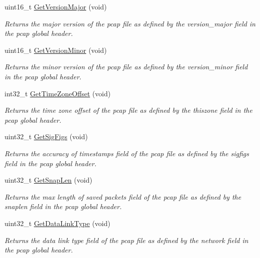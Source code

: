 \begin{DoxyCompactItemize}
uint16\+\_\+t \hyperlink{classns3_1_1PcapFile_a182c0d559994abde0e1c5691bbb6f2bd}{Get\+Version\+Major} (void)
\begin{DoxyCompactList}\small\item\em Returns the major version of the pcap file as defined by the version\+\_\+major field in the pcap global header. \end{DoxyCompactList}\item 
uint16\+\_\+t \hyperlink{classns3_1_1PcapFile_aec2a5893556ce03eface12adc8ef200d}{Get\+Version\+Minor} (void)
\begin{DoxyCompactList}\small\item\em Returns the minor version of the pcap file as defined by the version\+\_\+minor field in the pcap global header. \end{DoxyCompactList}\item 
int32\+\_\+t \hyperlink{classns3_1_1PcapFile_af2f76f02140b0cd7820f630382626d51}{Get\+Time\+Zone\+Offset} (void)
\begin{DoxyCompactList}\small\item\em Returns the time zone offset of the pcap file as defined by the thiszone field in the pcap global header. \end{DoxyCompactList}\item 
uint32\+\_\+t \hyperlink{classns3_1_1PcapFile_a7074106d671684484d083f5970723c07}{Get\+Sig\+Figs} (void)
\begin{DoxyCompactList}\small\item\em Returns the accuracy of timestamps field of the pcap file as defined by the sigfigs field in the pcap global header. \end{DoxyCompactList}\item 
uint32\+\_\+t \hyperlink{classns3_1_1PcapFile_a1ad2956ada10389364ee11fae1937e6b}{Get\+Snap\+Len} (void)
\begin{DoxyCompactList}\small\item\em Returns the max length of saved packets field of the pcap file as defined by the snaplen field in the pcap global header. \end{DoxyCompactList}\item 
uint32\+\_\+t \hyperlink{classns3_1_1PcapFile_aa3795e9a87e7a4151fb4d30747eaa072}{Get\+Data\+Link\+Type} (void)
\begin{DoxyCompactList}\small\item\em Returns the data link type field of the pcap file as defined by the network field in the pcap global header. \end{DoxyCompactList}\end{DoxyCompactItemize}
